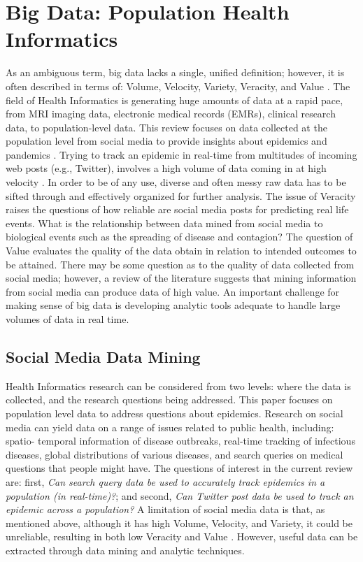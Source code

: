 \documentclass[sigconf]{acmart}
\begin{document}
\section{Big Data: Population Health Informatics}

As an ambiguous term, big data lacks a single, unified definition; however, it 
is often described in terms of: Volume, Velocity, Variety, Veracity, and Value 
\cite{demchenko12}. The field of Health Informatics is generating huge amounts 
of data at a rapid pace, from MRI imaging data, electronic medical records (EMRs), 
clinical research data, to population-level data. This review focuses on data 
collected at the population level from social media to provide insights about 
epidemics and pandemics  \cite{hay13, herland14}. Trying to track an epidemic in 
real-time from multitudes of incoming web posts (e.g., Twitter), involves a high 
volume of data coming in at high velocity \cite{lamb13, paul14}. In order to be 
of any use, diverse and often messy raw data has to be sifted through and effectively 
organized for further analysis. The issue of Veracity raises the questions of how 
reliable are social media posts for predicting real life events. What is the 
relationship between data mined from social media to biological events such as 
the spreading of disease and contagion? The question of Value evaluates the quality 
of the data obtain in relation to intended outcomes to be attained. There may be 
some question as to the quality of data collected from social media; however, a 
review of the literature suggests that mining information from social media can 
produce data of high value. An important challenge for making sense of big data 
is developing analytic tools adequate to handle large volumes of data in real time.


\subsection{Social Media Data Mining}

Health Informatics research can be considered from two levels: where the data is 
collected, and the research questions being addressed. This paper focuses on 
population level data to address questions about epidemics. Research on social media 
can yield data on a range of issues related to public health, including: spatio-
temporal information of disease outbreaks, real-time tracking of infectious diseases, 
global distributions of various diseases, and search queries on medical questions
that people might have. The questions of interest in the current review are: first, 
\textit{Can search query data be used to accurately track epidemics in a population 
(in real-time)?};  and second, \textit{Can Twitter post data be used to track an 
epidemic across a population?} A limitation of social media data is that, as 
mentioned above, although it has high Volume, Velocity, and Variety, it could be 
unreliable, resulting in both low Veracity and Value \cite{hay14, lazer14}. 
However, useful data can be extracted through data mining and analytic techniques. 
\end{document}
